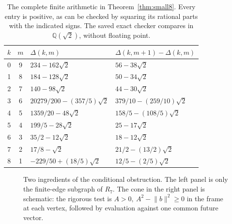 \documentclass[11pt]{article}
\theoremstyle{definition}\newtheorem{definition}[theorem]{Definition}
\theoremstyle{remark}\newtheorem{remark}[theorem]{Remark}
\newcommand{\Rseven}{R_7}
\begin{document}
\begin{table}[ht]\centering
\begin{tabular}{ccll}\toprule
\(k\)&\(m\)&\(\Delta(k,m)\)&\(\Delta(k,m+1)-\Delta(k,m)\)\\\midrule
0&9&\(234-162\sqrt2\)&\(56-38\sqrt2\)\\
1&8&\(184-128\sqrt2\)&\(50-34\sqrt2\)\\
2&7&\(140-98\sqrt2\)&\(44-30\sqrt2\)\\
3&6&\(20279/200-(357/5)\sqrt2\)&\(379/10-(259/10)\sqrt2\)\\
4&5&\(1359/20-48\sqrt2\)&\(158/5-(108/5)\sqrt2\)\\
5&4&\(199/5-28\sqrt2\)&\(25-17\sqrt2\)\\
6&3&\(35/2-12\sqrt2\)&\(18-12\sqrt2\)\\
7&2&\(17/8-\sqrt2\)&\(21/2-(13/2)\sqrt2\)\\
8&1&\(-229/50+(18/5)\sqrt2\)&\(12/5-(2/5)\sqrt2\)\\
\bottomrule\end{tabular}
\caption{The complete finite arithmetic in Theorem~\ref{thm:small8}.
Every entry is positive, as can be checked by squaring its rational
parts with the indicated signs. The saved exact checker compares in
\(\mathbb Q(\sqrt2)\), without floating point.}
\label{tab:radical}
\end{table}

\begin{figure}[ht]
\centering
{}
\caption{Two ingredients of the conditional obstruction. The left
panel is only the finite-edge subgraph of \(\Rseven\). The cone in the
right panel is schematic: the rigorous test is
\(A>0,\ A^2-\lVert b\rVert^2\ge0\) in the frame at each vertex,
followed by evaluation against one common future vector.}
\end{figure}
\end{document}
